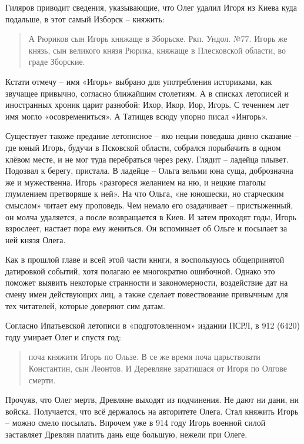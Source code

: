 Гиляров приводит сведения, указывающие, что Олег удалил Игоря из Киева куда подальше, в этот самый Изборск – княжить:

\begin{quotation}
А Рюриков сын Игорь княжаще в Зборьске. Ркп. Ундол. №77. Игорь же князь, сын великого князя Рюрика, княжаще в Плесковской области, во граде Зборские.
\end{quotation}

Кстати отмечу – имя «Игорь» выбрано для употребления историками, как звучащее привычно, согласно ближайшим столетиям. А в списках летописей и иностранных хроник царит разнобой: Ихор, Икор, Иор, Игорь. С течением лет имя могло «осовремениться». А Татищев всюду упорно писал «Ингорь».

Существует такоже предание летописное – яко нецыи поведаша дивно сказание – где юный Игорь, будучи в Псковской области, собрался порыбачить в одном клёвом месте, и не мог туда перебраться через реку. Глядит – ладейца плывет. Подозвал к берегу, пристала. В ладейце – Ольга вельми юна суща, доброзначна же и мужественна. Игорь «разгореся желанием на ню, и нецкие глаголы глумлением претворяше к ней». На что Ольга, «не юношески, но старческим смыслом» читает ему проповедь. Чем немало его озадачивает – пристыженный, он молча удаляется, а после возвращается в Киев. И затем проходят годы, Игорь взрослеет, настает пора ему жениться. Он вспоминает об Ольге и посылает за ней князя Олега. 

Как в прошлой главе и всей этой части книги, я воспользуюсь общепринятой датировкой событий, хотя полагаю ее многократно ошибочной. Однако это поможет выявить некоторые странности и закономерности, воздействие дат на смену имен действующих лиц, а также сделает повествование привычным для тех читателей, которые доверяют сим датам.

Согласно Ипатьевской летописи в «подготовленном» издании ПСРЛ, в 912 (6420) году умирает Олег и спустя год:

\begin{quotation}
поча княжити Игорь по Ользе. В се же время поча царьствовати Константин, сын Леонтов. И Деревляне заратишася от Игоря по Олгове смерти.
\end{quotation}

Прочуяв, что Олег мертв, Древляне выходят из подчинения. Не дают ни дани, ни войска. Получается, что всё держалось на авторитете Олега. Стал княжить Игорь – можно смело посылать. Впрочем уже в 914 году Игорь военной силой заставляет Древлян платить дань еще большую, нежели при Олеге. 

